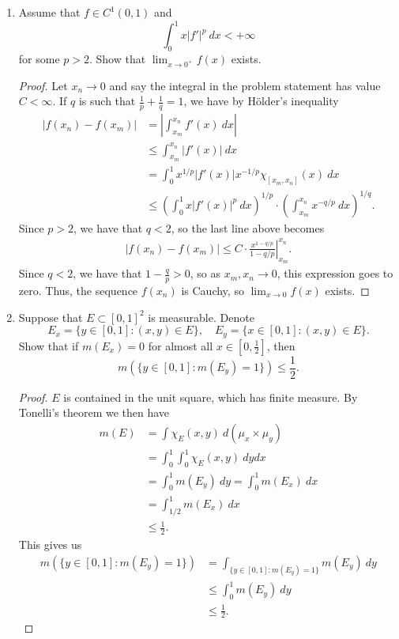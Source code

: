 \documentclass[11pt,letterpaper]{report}
\begin{document}
\begin{enumerate}
	\item Assume that $f\in C^1(0, 1)$ and
	\[
	\int_0^1x|f'|^p\ dx <+\infty
	\]
	for some $p>2$. Show that $\lim_{x\to 0^+}f(x)$ exists.
	\begin{proof}
		Let $x_n\to 0$ and say the integral in the problem statement has value $C<\infty$. If $q$ is such that $\frac{1}{p}+\frac{1}{q} = 1$, we have by H\"older's inequality
		\begin{align*}
			|f(x_n)-f(x_m)| &=\left| \int_{x_m}^{x_n}f'(x)\ dx\right|\\
			&\leq \int_{x_m}^{x_n}|f'(x)|\ dx\\
			&= \int_0^1x^{1/p}|f'(x)|x^{-1/p}\chi_{[x_m, x_n]}(x)\ dx\\
			&\leq \left(\int_0^1x|f'(x)|^p\ dx\right)^{1/p}\cdot \left(\int_{x_m}^{x_n}x^{-q/p}\ dx\right)^{1/q}.
		\end{align*}
		Since $p>2$, we have that $q<2$, so the last line above becomes
		\begin{align*}
			|f(x_n)-f(x_m)| \leq C\cdot \left.\frac{x^{1-q/p}}{1-q/p}\right|_{x_m}^{x_n}.
		\end{align*}
		Since $q<2$, we have that $1-\frac{q}{p}>0$, so as $x_m,x_n\to 0$, this expression goes to zero. Thus, the sequence $f(x_n)$ is Cauchy, so $\lim_{x\to 0}f(x)$ exists.
	\end{proof}

	\item Suppose that $E\subset [0,1]^2$ is measurable. Denote
	\[
	E_x = \{y\in [0,1]: (x,y)\in E\},\quad E_y = \{x\in [0,1]: (x,y)\in E\}.
	\]
	Show that if $m(E_x) = 0$ for almost all $x\in [0, \frac{1}{2}]$, then
	\[
	m(\{y\in [0,1]: m(E_y) = 1\})\leq \frac{1}{2}.
	\]
	\begin{proof}
		$E$ is contained in the unit square, which has finite measure. By Tonelli's theorem we then have
		\begin{align*}
			m(E) &= \int \chi_E(x,y)\ d(\mu_x\times \mu_y)\\
			&= \int_0^1\int_0^1\chi_E(x,y)\ dydx\\
			&= \int_0^1 m(E_y)\ dy =  \int_0^1m(E_x)\ dx\\
			&= \int_{1/2}^1m(E_x)\ dx\\
			&\leq \frac{1}{2}.
		\end{align*}
		This gives us
		\begin{align*}
		m(\{y\in [0,1]: m(E_y) = 1\}) &= \int_{\{y\in [0,1]: m(E_y) = 1\}}m(E_y)\ dy\\
		&\leq \int_0^1 m(E_y)\ dy\\
		&\leq \frac{1}{2}.
		\end{align*}
	\end{proof}


\end{enumerate}
\end{document}
